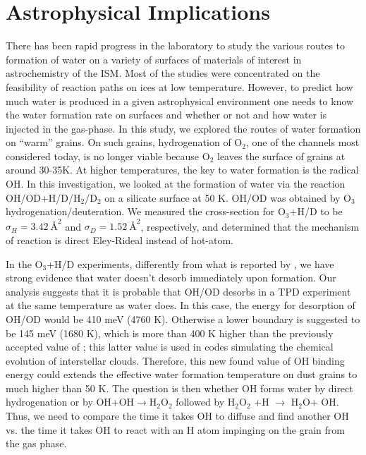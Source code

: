 \documentclass[iop]{emulateapj}
\begin{document}
\section{Astrophysical Implications}
\label{sec:sum}
There has been rapid progress in the laboratory to study the various routes to formation of water on a variety of surfaces of materials of interest in astrochemistry of the ISM. Most of the studies were concentrated on the feasibility of reaction paths on ices at low temperature. However, to predict how much water is produced in a given astrophysical environment one needs to know the water formation rate on surfaces and whether or not and how water is injected in the gas-phase. In this study, we explored the routes  of water formation on ``warm''   grains. On such grains, hydrogenation of O$_2$, one of the channels most considered today, is no longer viable because O$_2$ leaves the surface of grains at around 30-35K. At higher temperatures, the key to water formation is the radical OH. In this investigation, we looked at the formation of water via the reaction OH/OD+H/D/H$_2$/D$_2$ on a silicate surface at 50 K. OH/OD was obtained by O$_3$ hydrogenation/deuteration. We measured the cross-section for O$_3$+H/D to be $\sigma_H=3.42\ \text{\AA}^2$ and $\sigma_D=1.52\ \text{\AA}^2$, respectively, and determined that the mechanism of reaction is direct Eley-Rideal instead of hot-atom. 

 In the O$_3$+H/D experiments, differently from what is reported by \citet{Dulieu2013}, we have strong evidence that water doesn't desorb immediately upon formation. Our analysis suggests that it is probable that OH/OD desorbs in a TPD experiment at the same temperature as water does. In this case, the energy for desorption of OH/OD would be 410 meV (4760 K). Otherwise a lower boundary is suggested to be 145 meV (1680 K), which is more than 400 K higher than the previously accepted value of \citet{Allen1977}; this latter value is used in codes simulating the chemical evolution of interstellar clouds. Therefore, this new found value of OH binding energy could extends the effective water formation temperature on dust grains to much higher than 50 K. The question is then whether OH forms water by direct hydrogenation or by OH+OH$\rightarrow$H$_2$O$_2$ followed by H$_2$O$_2$ +H $\rightarrow$ H$_2$O+ OH. Thus, we need to compare the time it takes OH to diffuse and find another OH vs. the time it takes OH to react with an H atom impinging on the grain from the gas phase. 
\end{document}
